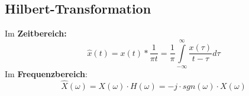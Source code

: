   \subsection{Hilbert-Transformation}
  \begin{multicols}{2}
    Im \textbf{Zeitbereich:}
    $$\hat{x}(t) = x(t) * \frac{1}{\pi t} = \frac{1}{\pi} \int \limits _{-\infty} ^{\infty} \frac{x(\tau)}{t-\tau} d\tau$$
    Im \textbf{Frequenzbereich}:
    $$\hat{X}(\omega) = X(\omega) \cdot H(\omega) = -j \cdot sgn(\omega) \cdot X(\omega)$$
\end{multicols}
